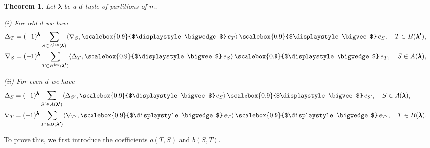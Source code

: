 \documentclass[12pt, reqno]{amsart}
\newtheorem{theorem}{Theorem}[section]
\theoremstyle{definition}
\newcommand{\lex}{\mathrm{lex}}
\let\oldbigwedge\bigwedge
\let\oldbigvee\bigvee
\renewcommand{\bigwedge}{
  \mathop{
    \vcenter{
      \hbox{\scalebox{0.9}{$\displaystyle\oldbigwedge$}}
    }
  }
}
\renewcommand{\bigvee}{
  \mathop{
    \vcenter{
      \hbox{\scalebox{0.9}{$\displaystyle\oldbigvee$}}
    }
  }
}
\begin{document}
\begin{theorem}%
\label{th:duality2}
    Let $\pmb{\lambda}$ be a $d$-tuple of partitions of $m$. 
    
    (i) For odd $d$ we have 
    \begin{align*}
        \Delta_{T} &= (-1)^{\pmb{\lambda}} \sum_{S \in A^\lex(\pmb{\lambda})} \langle \nabla_S, \bigwedge e_{T} \rangle \bigvee e_S, \quad T \in B(\pmb{\lambda'}), \\
        \nabla_{S} &= (-1)^{\pmb{\lambda}} \sum_{T \in B^\lex(\pmb{\lambda'})} \langle \Delta_T, \bigvee e_{S} \rangle \bigwedge e_T, \quad S \in A(\pmb{\lambda}),
    \end{align*}
    
    (ii) For even $d$ we have 
    \begin{align*}
        \Delta_{S} &= (-1)^{\pmb{\lambda}} \sum_{S' \in A(\pmb{\lambda'})} 
            \langle \Delta_{S'}, \bigvee e_S \rangle \bigvee e_{S'}, \quad S \in A(\pmb{\lambda}), \\
        \nabla_{T} &= (-1)^{\pmb{\lambda}} \sum_{T' \in B(\pmb{\lambda'})} 
            \langle \nabla_{T'}, \bigwedge e_T \rangle \bigwedge e_{T'}, \quad T \in B(\pmb{\lambda}).
    \end{align*}    
\end{theorem}

To prove this, we first introduce the coefficients $a(T, S)$ and $b(S, T)$.
\end{document}

